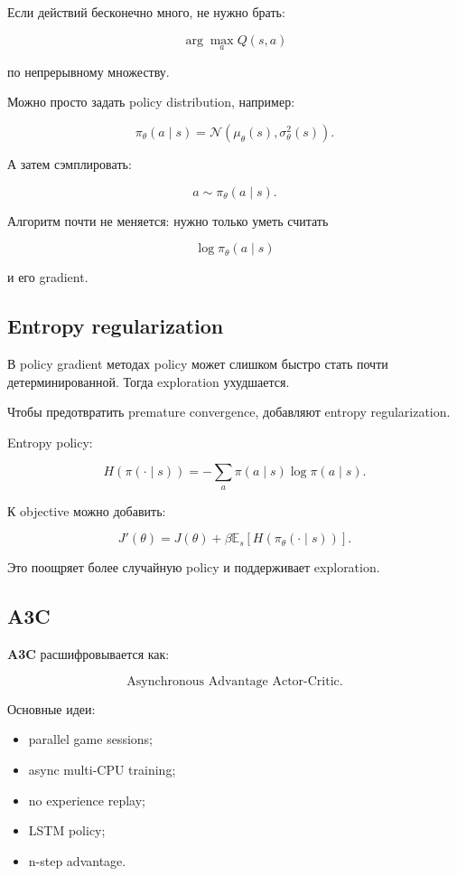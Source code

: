 \documentclass[a4paper,12pt]{article}
\begin{document}
Если действий бесконечно много, не нужно брать:

\[
\arg\max_a Q(s,a)
\]

по непрерывному множеству.

Можно просто задать policy distribution, например:

\[
\pi_\theta(a\mid s)
=
\mathcal{N}
(
\mu_\theta(s),
\sigma_\theta^2(s)
).
\]

А затем сэмплировать:

\[
a \sim \pi_\theta(a\mid s).
\]

Алгоритм почти не меняется: нужно только уметь считать

\[
\log \pi_\theta(a\mid s)
\]

и его gradient.

\subsection{Entropy regularization}

В policy gradient методах policy может слишком быстро стать почти детерминированной. Тогда exploration ухудшается.

Чтобы предотвратить premature convergence, добавляют entropy regularization.

Entropy policy:

\[
H(\pi(\cdot\mid s))
=
-
\sum_a
\pi(a\mid s)
\log \pi(a\mid s).
\]

К objective можно добавить:

\[
J'(\theta)
=
J(\theta)
+
\beta
\mathbb{E}_s
[
H(\pi_\theta(\cdot\mid s))
].
\]

Это поощряет более случайную policy и поддерживает exploration.

\subsection{A3C}

\textbf{A3C} расшифровывается как:

\[
\text{Asynchronous Advantage Actor-Critic}.
\]

Основные идеи:

\begin{itemize}
    \item parallel game sessions;
    \item async multi-CPU training;
    \item no experience replay;
    \item LSTM policy;
    \item n-step advantage.
\end{itemize}
\end{document}
